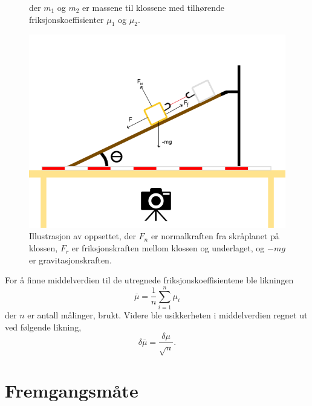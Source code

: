 \documentclass[10pt,a4paper]{report}
\begin{document}
\begin{figure}
der $m_1$ og $m_2$ er massene til klossene med tilhørende friksjonskoeffisienter $\mu_1$ og $\mu_2$.
\begin{center}
\includegraphics[scale=0.5]{withforces}
\caption{Illustrasjon av oppsettet, der $F_n$ er normalkraften fra skråplanet på klossen, $F_r$ er friksjonskraften mellom klossen og underlaget, og $-mg$ er gravitasjonskraften.}
\end{center}
\label{oppsett}
\end{figure}

For å finne middelverdien til de utregnede friksjonskoeffisientene ble likningen
\begin{equation}
\overline{\mu} = \dfrac{1}{n}\sum_{i=1}^{n}\mu_i
\end{equation}
 der $n$ er antall målinger, brukt. Videre ble usikkerheten i middelverdien regnet ut ved følgende likning,
\begin{equation}
\delta\overline{\mu} = \dfrac{\delta\mu}{\sqrt{n}}.
\end{equation}

\chapter*{Fremgangsmåte}
\end{document}
